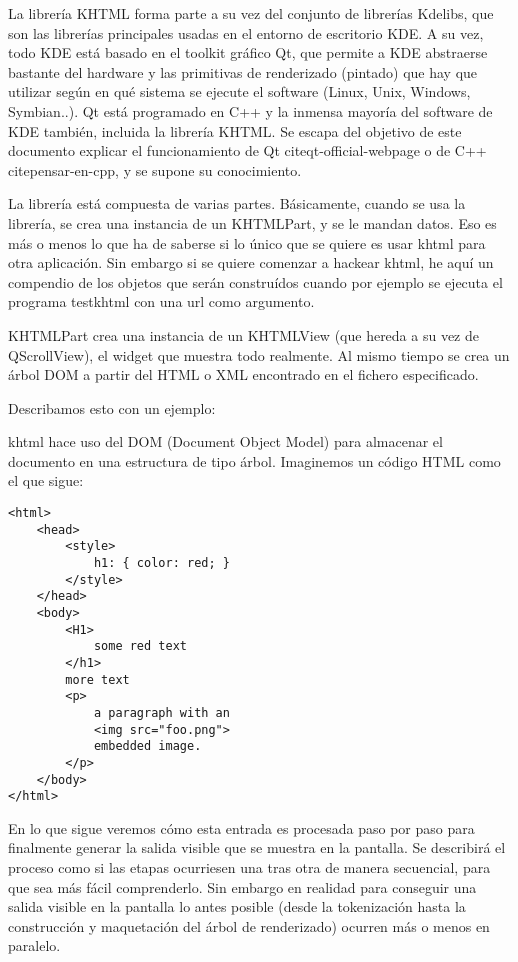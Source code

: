 La librería KHTML forma parte a su vez del conjunto de librerías Kdelibs, que son las librerías principales usadas en el entorno de escritorio KDE. A su vez, todo KDE está basado en el toolkit gráfico Qt, que permite a KDE abstraerse bastante del hardware y las primitivas de renderizado (pintado) que hay que utilizar según en qué sistema se ejecute el software (Linux, Unix, Windows, Symbian..). Qt está programado en C++ y la inmensa mayoría del software de KDE también, incluida la librería KHTML. Se escapa del objetivo de este documento explicar el funcionamiento de Qt  cite{qt-official-webpage} o de C++  cite{pensar-en-cpp}, y se supone su conocimiento.

La librería está compuesta de varias partes. Básicamente, cuando se usa la librería, se crea una instancia de un KHTMLPart, y se le mandan datos. Eso es más o menos lo que ha de saberse si lo único que se quiere es usar khtml para otra aplicación. Sin embargo si se quiere comenzar a hackear khtml, he aquí un compendio de los objetos que serán construídos cuando por ejemplo se ejecuta el programa testkhtml con una url como argumento.

KHTMLPart crea una instancia de un KHTMLView (que hereda a su vez de QScrollView), el widget que muestra todo realmente. Al mismo tiempo se crea un árbol DOM a partir del HTML o XML encontrado en el fichero especificado.

Describamos esto con un ejemplo:

khtml hace uso del DOM (Document Object Model) para almacenar el documento en una estructura de tipo árbol. Imaginemos un código HTML como el que sigue:

\begin{verbatim}
<html>
    <head>
        <style>
            h1: { color: red; }
        </style>
    </head>
    <body>
        <H1>
            some red text
        </h1>
        more text
        <p>
            a paragraph with an
            <img src="foo.png">
            embedded image.
        </p>
    </body>
</html>
\end{verbatim} 

En lo que sigue veremos cómo esta entrada es procesada paso por paso para finalmente generar la salida visible que se muestra en la pantalla. Se describirá el proceso como si las etapas ocurriesen una tras otra de manera secuencial, para que sea más fácil comprenderlo. Sin embargo en realidad para conseguir una salida visible en la pantalla lo antes posible (desde la tokenización hasta la construcción y maquetación del árbol de renderizado) ocurren más o menos en paralelo.

